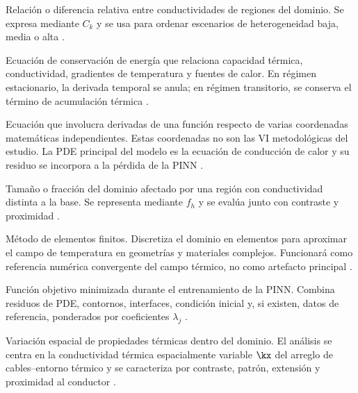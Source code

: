 \begin{description}[style=nextline,itemsep=0.5\baselineskip,parsep=0pt,topsep=0.25\baselineskip]
  \item[Contraste de conductividad.] Relación o diferencia relativa entre conductividades de regiones del dominio. Se expresa mediante $C_k$ y se usa para ordenar escenarios de heterogeneidad baja, media o alta \parencites{farouki1981thermal,devries1966thermal}[1,6--9]{khumalo2025}[1,10,16]{kim2025}.

  \item[Ecuación de conducción de calor.] Ecuación de conservación de energía que relaciona capacidad térmica, conductividad, gradientes de temperatura y fuentes de calor. En régimen estacionario, la derivada temporal se anula; en régimen transitorio, se conserva el término de acumulación térmica \parencites{carslaw1959conduction,kakac2018heatConduction,hahn2012heatConduction}[1,3]{xing2023}[1,3,16]{pan2025}.

  \item[Ecuación diferencial en derivadas parciales o PDE.] Ecuación que involucra derivadas de una función respecto de varias coordenadas matemáticas independientes. Estas coordenadas no son las VI metodológicas del estudio. La PDE principal del modelo es la ecuación de conducción de calor y su residuo se incorpora a la pérdida de la PINN \parencites[686--690]{raissi2019}[1--2]{lawal2022}.

  \item[Extensión de heterogeneidad.] Tamaño o fracción del dominio afectado por una región con conductividad distinta a la base. Se representa mediante $f_h$ y se evalúa junto con contraste y proximidad \parencites[4--6]{enescu2021}[1,6--9]{khumalo2025}[1,10,16]{kim2025}.

  \item[FEM.] Método de elementos finitos. Discretiza el dominio en elementos para aproximar el campo de temperatura en geometrías y materiales complejos. Funcionará como referencia numérica convergente del campo térmico, no como artefacto principal \parencites[4--6]{enescu2021}{patankar1980numerical}[3--4,93--99]{cigre2025}.

  \item[Función de pérdida.] Función objetivo minimizada durante el entrenamiento de la PINN. Combina residuos de PDE, contornos, interfaces, condición inicial y, si existen, datos de referencia, ponderados por coeficientes $\lambda_j$ \parencites[686--690]{raissi2019}[16]{pan2025}[1--2,17]{lawal2022}.

\item[Heterogeneidad térmica.] Variación espacial de propiedades térmicas dentro del dominio. El análisis se centra en la conductividad térmica espacialmente variable $\kx$ del arreglo de cables--entorno térmico y se caracteriza por contraste, patrón, extensión y proximidad al conductor \parencites{farouki1981thermal,devries1966thermal}[4--6]{enescu2021}[1,6--9]{khumalo2025}[1,10,16]{kim2025}.


\end{description}
